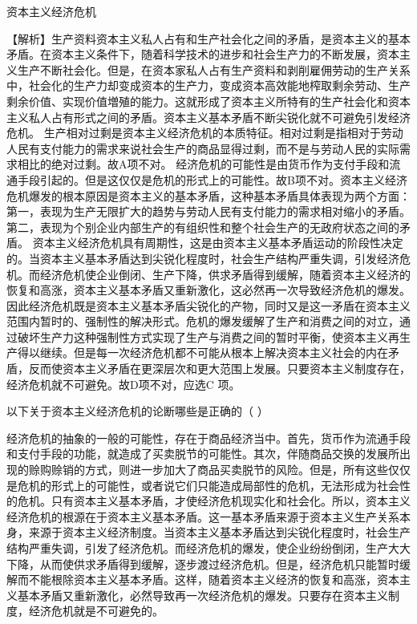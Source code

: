 \question 资本主义经济危机
\par{}
\begin{solution}【解析】生产资料资本主义私人占有和生产社会化之间的矛盾，是资本主义的基本矛盾。在资本主义条件下，随着科学技术的进步和社会生产力的不断发展，资本主义生产不断社会化。但是，在资本家私人占有生产资料和剥削雇佣劳动的生产关系中，社会化的生产力却变成资本的生产力，变成资本高效能地榨取剩余劳动、生产剩余价值、实现价值増殖的能力。这就形成了资本主义所特有的生产社会化和资本主义私人占有形式之间的矛盾。资本主义基本矛盾不断尖锐化就不可避免引发经济危机。
生产相对过剩是资本主义经济危机的本质特征。相对过剩是指相对于劳动人民有支付能力的需求来说社会生产的商品显得过剩，而不是与劳动人民的实际需求相比的绝对过剩。故A项不对。
经济危机的可能性是由货币作为支付手段和流通手段引起的。但是这仅仅是危机的形式上的可能性。故B项不对。资本主义经济危机爆发的根本原因是资本主义的基本矛盾，这种基本矛盾具体表现为两个方面：第一，表现为生产无限扩大的趋势与劳动人民有支付能力的需求相对缩小的矛盾。第二，表现为个别企业内部生产的有组织性和整个社会生产的无政府状态之间的矛盾。
资本主义经济危机具有周期性，这是由资本主义基本矛盾运动的阶段性决定的。当资本主义基本矛盾达到尖锐化程度时，社会生产结构严重失调，引发经济危机。而经济危机使企业倒闭、生产下降，供求矛盾得到缓解，随着资本主义经济的恢复和高涨，资本主义基本矛盾又重新激化，这必然再一次导致经济危机的爆发。
因此经济危机既是资本主义基本矛盾尖锐化的产物，同时又是这一矛盾在资本主义范围内暂时的、强制性的解决形式。危机的爆发缓解了生产和消费之间的对立，通过破坏生产力这种强制性方式实现了生产与消费之间的暂时平衡，使资本主义再生产得以继续。但是每一次经济危机都不可能从根本上解决资本主义社会的内在矛盾，反而使资本主义矛盾在更深层次和更大范围上发展。只要资本主义制度存在，经济危机就不可避免。故D项不对，应选C
项。
\end{solution}
\question 以下关于资本主义经济危机的论断哪些是正确的（ ）
\par\fourch{\textcolor{red}{经济危机的可能性在资本主义制度建立之前就存在}}{\textcolor{red}{资本主义经济危机是资本主义基本矛盾尖锐化的结果}}{\textcolor{red}{经济危机能够缓解生产和消费的关系}}{\textcolor{red}{只要资本主义制度存在，经济危机就不可避免}}
\begin{solution}经济危机的抽象的一般的可能性，存在于商品经济当中。首先，货币作为流通手段和支付手段的功能，就造成了买卖脱节的可能性。其次，伴随商品交换的发展所出现的赊购赊销的方式，则进一步加大了商品买卖脱节的风险。但是，所有这些仅仅是危机的形式上的可能性，或者说它们只能造成局部性的危机，无法形成为社会性的危机。只有资本主义基本矛盾，才使经济危机现实化和社会化。所以，资本主义经济危机的根源在于资本主义基本矛盾。这一基本矛盾来源于资本主义生产关系本身，来源于资本主义经济制度。当资本主义基本矛盾达到尖锐化程度时，社会生产结构严重失调，引发了经济危机。而经济危机的爆发，使企业纷纷倒闭，生产大大下降，从而使供求矛盾得到缓解，逐步渡过经济危机。但是，经济危机只能暂时缓解而不能根除资本主义基本矛盾。这样，随着资本主义经济的恢复和高涨，资本主义基本矛盾又重新激化，必然导致再一次经济危机的爆发。只要存在资本主义制度，经济危机就是不可避免的。
\end{solution}
